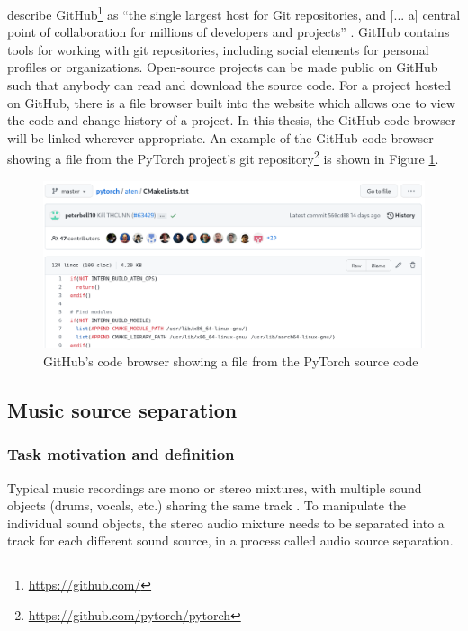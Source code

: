 \documentclass[report.tex]{subfiles}
\begin{document}
\citeauthor{gitbook} describe GitHub\footnote{\url{https://github.com/}} as ``the single largest host for Git repositories, and [... a] central point of collaboration for millions of developers and projects'' \parencite[131]{gitbook}. GitHub contains tools for working with git repositories, including social elements for personal profiles or organizations. Open-source projects can be made public on GitHub such that anybody can read and download the source code. For a project hosted on GitHub, there is a file browser built into the website which allows one to view the code and change history of a project. In this thesis, the GitHub code browser will be linked wherever appropriate. An example of the GitHub code browser showing a file from the PyTorch project's git repository\footnote{\url{https://github.com/pytorch/pytorch}} is shown in Figure \ref{fig:githubpytorch}.

\begin{figure}[ht]
	\centering
	\includegraphics[width=\textwidth]{./images-misc/github.png}
	\caption{GitHub's code browser showing a file from the PyTorch source code}
	\label{fig:githubpytorch}
\end{figure}

\newpagefill

\subsection{Music source separation}
\label{sec:musicsep}

\subsubsection{Task motivation and definition}

Typical music recordings are mono or stereo mixtures, with multiple sound objects (drums, vocals, etc.) sharing the same track \parencite{musicsepintro1}. To manipulate the individual sound objects, the stereo audio mixture needs to be separated into a track for each different sound source, in a process called audio source separation.
\end{document}

